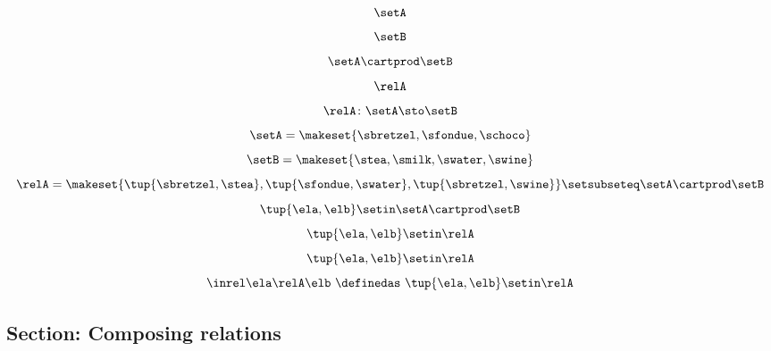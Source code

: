 \begin{forslides}
    \begin{equation}
        \label{eq:slides_session2_rel_72}
        \setA
    \end{equation}
    \begin{equation}
        \label{eq:slides_session2_rel_73}
        \setB
    \end{equation}
    \begin{equation}
        \label{eq:slides_session2_rel_74}
        \setA \cartprod \setB
    \end{equation}
    \begin{equation}
        \label{eq:slides_session2_rel_75}
        \relA
    \end{equation}
    \begin{equation}
        \label{eq:slides_session2_rel_76}
        \relA \colon \setA \sto \setB
    \end{equation}
    \begin{equation}
        \label{eq:slides_session2_rel_77}
        \setA = \makeset{ \sbretzel, \sfondue, \schoco }
    \end{equation}
    \begin{equation}
        \label{eq:slides_session2_rel_78}
        \setB = \makeset{ \stea, \smilk, \swater, \swine }
    \end{equation}
    \begin{equation}
        \label{eq:slides_session2_rel_79}
        \relA = \makeset{ \tup{\sbretzel, \stea}, \tup{\sfondue, \swater}, \tup{\sbretzel, \swine} } \setsubseteq \setA \cartprod \setB
    \end{equation}
    \begin{equation}
        \label{eq:slides_session2_rel_80}
        \tup{\ela,\elb} \setin \setA \cartprod \setB
    \end{equation}
    \begin{equation}
        \label{eq:slides_session2_rel_81}
        \tup{\ela,\elb} \setin \relA
    \end{equation}
    \begin{equation}
        \label{eq:slides_session2_rel_82}
        \tup{\ela,\elb}\setin \relA
    \end{equation}
    \begin{equation}
        \label{eq:slides_session2_rel_83}
        \inrel \ela \relA \elb \ \definedas\  \tup{\ela,\elb}\setin \relA
    \end{equation}

    \subsection{Section: Composing relations}


\end{forslides}
